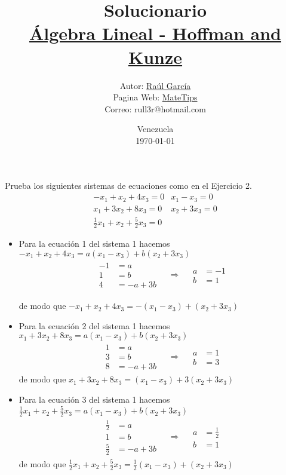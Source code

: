 \documentclass[10pt,a4paper]{jhwhw}
\author{Autor: \href{https://www.facebook.com/ruller}{Raúl García}\\Pagina Web: \href{https://rull3r.github.io/}{MateTips}\\Correo: rull3r@hotmail.com}
\date{Venezuela\\ \today \\}
\title{Solucionario \\\href{https://books.google.co.ve/books?id=XPcoPwAACAAJ}{Álgebra Lineal - Hoffman and Kunze}\\}
\begin{document}
	
	\problema{ }\label{pro:3}
	Prueba los siguientes sistemas de ecuaciones como en el Ejercicio 2.
	\begin{eqnarray*}
		-x_1+x_2+4x_3=0 & x_1-x_3=0\\
		x_1+3x_2+8x_3=0 & x_2+3x_3=0\\
		\frac{1}{2}x_1+x_2+\frac{5}{2}x_3=0 & 
	\end{eqnarray*}

	\solution
	
	\begin{itemize}
		\item Para la ecuación 1 del sistema 1 hacemos $-x_1+x_2+4x_3=a(x_1-x_3)+b(x_2+3x_3)$
		\begin{align*}
		\begin{aligned}
		-1&= a \\
		1&=b	\\
		4&=-a+3b
		\end{aligned}
		\quad
		\Rightarrow
		\quad
		\begin{aligned}
		a&= -1 \\
		b&= 1
		\end{aligned}
		\end{align*}
		
		de modo que $-x_1+x_2+4x_3=-(x_1-x_3)+(x_2+3x_3)$
		
		\item Para la ecuación 2 del sistema 1 hacemos $x_1+3x_2+8x_3=a(x_1-x_3)+b(x_2+3x_3)$
		\begin{align*}
		\begin{aligned}
		1&= a \\
		3&= b	\\
		8&= -a+3b
		\end{aligned}
		\quad
		\Rightarrow
		\quad
		\begin{aligned}
		a&=1 \\
		b&= 3
		\end{aligned}
		\end{align*}
		de modo que $x_1+3x_2+8x_3=(x_1-x_3)+3(x_2+3x_3)$
		
		\item Para la ecuación 3 del sistema 1 hacemos $\frac{1}{2}x_1+x_2+\frac{5}{2}x_3=a(x_1-x_3)+b(x_2+3x_3)$
		\begin{align*}
		\begin{aligned}
		\frac{1}{2}&= a \\
		1&= b	\\
		\frac{5}{2}&= -a+3b
		\end{aligned}
		\quad
		\Rightarrow
		\quad
		\begin{aligned}
		a&=\frac{1}{2} \\
		b&= 1
		\end{aligned}
		\end{align*}
		de modo que $\frac{1}{2}x_1+x_2+\frac{5}{2}x_3=\frac{1}{2}(x_1-x_3)+(x_2+3x_3)$
		

\end{itemize}
\end{document}
